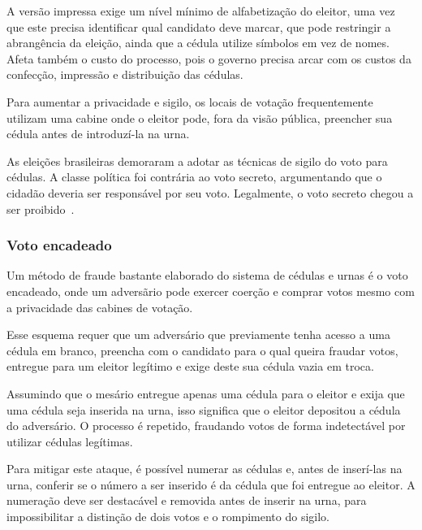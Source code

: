 A versão impressa exige um nível mínimo de alfabetização do eleitor, uma vez
que este precisa identificar qual candidato deve marcar, que pode restringir a
abrangência da eleição, ainda que a cédula utilize símbolos em vez de nomes.
Afeta também o custo do processo, pois o governo precisa arcar com os custos da
confecção, impressão e distribuição das cédulas.

Para aumentar a privacidade e sigilo, os locais de votação frequentemente
utilizam uma cabine onde o eleitor pode, fora da visão pública, preencher sua
cédula antes de introduzí-la na urna.

As eleições brasileiras demoraram a adotar as técnicas de sigilo do voto para
cédulas. A classe política foi contrária ao voto secreto, argumentando que o
cidadão deveria ser responsável por seu voto. Legalmente, o voto secreto chegou
a ser proibido~\cite{nicolau2012eleicoes}.

\subsubsection{Voto encadeado}

Um método de fraude bastante elaborado do sistema de cédulas e urnas é o voto
encadeado, onde um adversãrio pode exercer coerção e comprar votos mesmo com a
privacidade das cabines de votação.

Esse esquema requer que um adversário que previamente tenha acesso a uma cédula
em branco, preencha com o candidato para o qual queira fraudar votos, entregue
para um eleitor legítimo e exige deste sua cédula vazia em troca.

Assumindo que o mesário entregue apenas uma cédula para o eleitor e exija que
uma cédula seja inserida na urna, isso significa que o eleitor depositou a
cédula do adversário. O processo é repetido, fraudando votos de forma
indetectável por utilizar cédulas legítimas.

Para mitigar este ataque, é possível numerar as cédulas e, antes de inserí-las
na urna, conferir se o número a ser inserido é da cédula que foi entregue ao
eleitor. A numeração deve ser destacável e removida antes de inserir na urna,
para impossibilitar a distinção de dois votos e o rompimento do sigilo.
